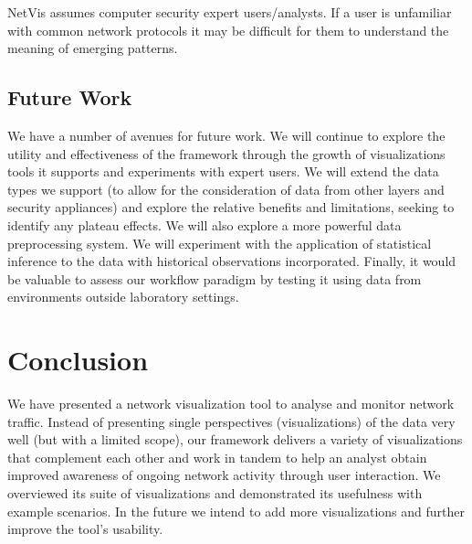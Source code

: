 NetVis assumes computer security expert users/analysts. If a user is unfamiliar with common network
protocols it may be difficult for them to understand the meaning of emerging patterns. 

\subsection{Future Work}
%
We have a number of avenues for future work. We will continue to explore the utility and
effectiveness of the framework through the growth of visualizations tools it supports and
experiments with expert users. We will extend the data types we support (to allow for the
consideration of data from other layers and security appliances) and explore the relative benefits
and limitations, seeking to identify any plateau effects. We will also explore a more powerful data
preprocessing system. We will experiment with the application of statistical inference to the data
with historical observations incorporated. Finally, it would be valuable to assess our workflow
paradigm by testing it using data from environments outside laboratory settings.

\section{Conclusion} \label{sec:conc}
%
We have presented a network visualization tool to analyse and monitor network traffic. Instead of
presenting single perspectives (visualizations) of the data very well (but with a limited scope),
our framework delivers a variety of visualizations that complement each other and work in tandem to
help an analyst obtain improved awareness of ongoing network activity through user interaction. We
overviewed its suite of visualizations and demonstrated its usefulness with example scenarios. In
the future we intend to add more visualizations and further improve the tool's usability.





